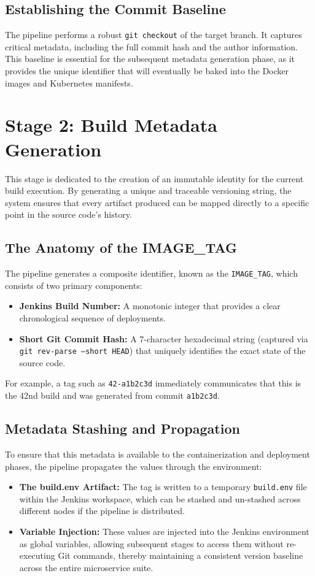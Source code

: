 \documentclass[12pt,a4paper]{report}
\begin{document}
\subsection{Establishing the Commit Baseline}
The pipeline performs a robust \texttt{git checkout} of the target branch. It captures critical metadata, including the full commit hash and the author information. This baseline is essential for the subsequent metadata generation phase, as it provides the unique identifier that will eventually be baked into the Docker images and Kubernetes manifests.

\section{Stage 2: Build Metadata Generation}
This stage is dedicated to the creation of an immutable identity for the current build execution. By generating a unique and traceable versioning string, the system ensures that every artifact produced can be mapped directly to a specific point in the source code's history.

\subsection{The Anatomy of the IMAGE\_TAG}
The pipeline generates a composite identifier, known as the \texttt{IMAGE\_TAG}, which consists of two primary components:
\begin{itemize}
    \item \textbf{Jenkins Build Number:} A monotonic integer that provides a clear chronological sequence of deployments.
    \item \textbf{Short Git Commit Hash:} A 7-character hexadecimal string (captured via \texttt{git rev-parse --short HEAD}) that uniquely identifies the exact state of the source code.
\end{itemize}
For example, a tag such as \texttt{42-a1b2c3d} immediately communicates that this is the 42nd build and was generated from commit \texttt{a1b2c3d}.

\subsection{Metadata Stashing and Propagation}
To ensure that this metadata is available to the containerization and deployment phases, the pipeline propagates the values through the environment:
\begin{itemize}
    \item \textbf{The build.env Artifact:} The tag is written to a temporary \texttt{build.env} file within the Jenkins workspace, which can be stashed and un-stashed across different nodes if the pipeline is distributed.
    \item \textbf{Variable Injection:} These values are injected into the Jenkins environment as global variables, allowing subsequent stages to access them without re-executing Git commands, thereby maintaining a consistent version baseline across the entire microservice suite.
\end{itemize}
\end{document}
